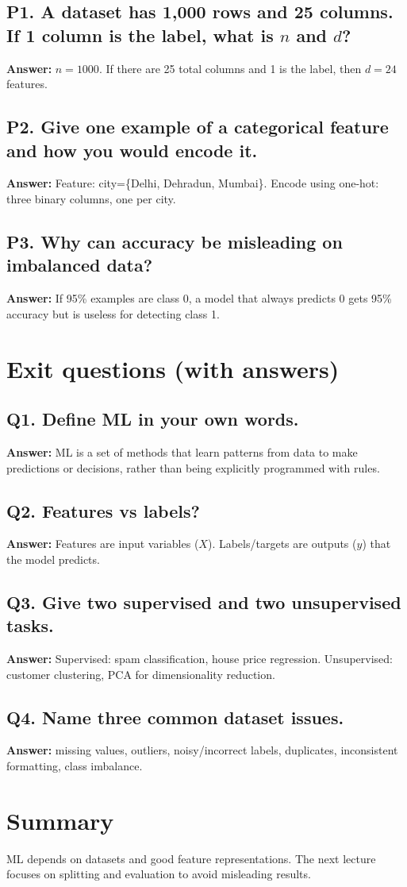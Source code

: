 \documentclass[11pt]{article}
\begin{document}
\subsection*{P1. A dataset has 1,000 rows and 25 columns. If 1 column is the label, what is $n$ and $d$?}
\textbf{Answer:} $n=1000$. If there are 25 total columns and 1 is the label, then $d=24$ features.

\subsection*{P2. Give one example of a categorical feature and how you would encode it.}
\textbf{Answer:} Feature: city=\{Delhi, Dehradun, Mumbai\}. Encode using one-hot: three binary columns, one per city.

\subsection*{P3. Why can accuracy be misleading on imbalanced data?}
\textbf{Answer:} If 95\% examples are class 0, a model that always predicts 0 gets 95\% accuracy but is useless for detecting class 1.

\section{Exit questions (with answers)}

\subsection*{Q1. Define ML in your own words.}
\textbf{Answer:} ML is a set of methods that learn patterns from data to make predictions or decisions, rather than being explicitly programmed with rules.

\subsection*{Q2. Features vs labels?}
\textbf{Answer:} Features are input variables ($X$). Labels/targets are outputs ($y$) that the model predicts.

\subsection*{Q3. Give two supervised and two unsupervised tasks.}
\textbf{Answer:} Supervised: spam classification, house price regression. Unsupervised: customer clustering, PCA for dimensionality reduction.

\subsection*{Q4. Name three common dataset issues.}
\textbf{Answer:} missing values, outliers, noisy/incorrect labels, duplicates, inconsistent formatting, class imbalance.

\section{Summary}
ML depends on datasets and good feature representations. The next lecture focuses on splitting and evaluation to avoid misleading results.
\notesources{\AIMLUnitIIISources}
\end{document}
